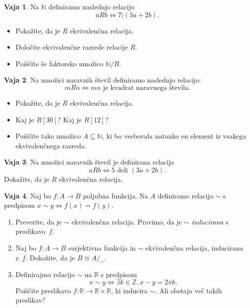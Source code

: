\documentclass{article}
\newcommand{\some}[1]{\exists #1 .\,}
\newcommand{\NN}{\mathbb{N}}
\newcommand{\ZZ}{\mathbb{Z}}
\newcommand{\RR}{\mathbb{R}}
\theoremstyle{definition}
\newtheorem{vaja}{Vaja}
\begin{document}
\begin{vaja}
  Na $\NN$ definiramo naslednjo relacijo
  \[a R b \iff 7 | (5a+2b).\]
  \begin{itemize}
    \item Pokažite, da je $R$ ekvivalenčna relacija.
    \item Določite ekvivalenčne razrede relacije $R$.
    \item Poiščite še faktorsko množico $\NN/R$.
  \end{itemize}
\end{vaja}

\begin{vaja}
  Na množici naravnih števil definiramo naslednjo relacijo:
  \[m R n \iff \text{$m n$ je kvadrat naravnega števila}.\]
  \begin{itemize}
    \item
      Pokažite, da je $R$ ekvivalenčna relacija.
    \item
      Kaj je $R[30]$? Kaj je $R[12]$?
    \item
      Poiščite tako množico $A \subseteq \NN$, ki bo vsebovala natanko en element iz vsakega ekvivalenčnega razreda.
  \end{itemize}
\end{vaja}

\begin{vaja}
  Na množici naravnih števil je definirana relacija
  \begin{equation*}
    a R b \iff \text{$5$ deli $(3a+2b)$}.
  \end{equation*}
  Dokažite, da je $R$ ekvivalenčna relacija.
\end{vaja}

\begin{vaja}
  Naj bo $f\colon A \to B$ poljubna funkcija. Na $A$ definiramo relacijo $\sim$ s predpisom $x \sim y \iff f(x) = f(y)$.
  \begin{enumerate}
    \item
      Preverite, da je $\sim$ ekvivalenčna relacija. Pravimo, da je $\sim$ \emph{inducirana} s preslikavo~$f$.
    \item
      Naj bo $f\colon A \to B$ surjektivna funkcija in $\sim$ ekvivalenčna relacija, inducirana z~$f$. Dokažite, da je $B \cong A/_\sim$.
    \item
      Definirajmo relacijo $\sim$ na $\RR$ s predpisom
      \begin{equation*}
        x \sim y \iff \some{k \in \ZZ}{x - y = 2 \pi k}.
      \end{equation*}
      Poiščite preslikavo $f\colon \RR \to \RR \times \RR$, ki inducira $\sim$. Ali obstaja več takih preslikav?
  \end{enumerate}
\end{vaja}
\end{document}
